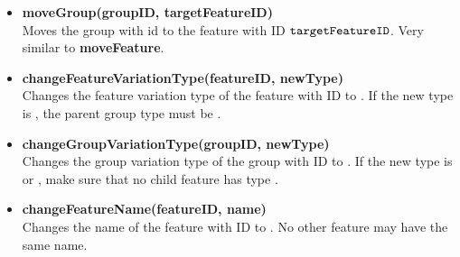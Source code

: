 \begin{itemize}
  \item \textbf{moveGroup(groupID, targetFeatureID)} \\
    Moves the group with id  to the feature with ID $\texttt{targetFeatureID}$. Very similar to \textbf{moveFeature}. 
  \item \textbf{changeFeatureVariationType(featureID, newType)} \\
    Changes the feature variation type of the feature with ID  to . If the new type is \mandatory{}, the parent group type must be \andtype{}. 
  \item \textbf{changeGroupVariationType(groupID, newType)}\\
    Changes the group variation type of the group with ID  to . If the new type is \ortype{} or \xortype{}, make sure that no child feature has type \mandatory{}. 
  \item \textbf{changeFeatureName(featureID, name)}\\
    Changes the name of the feature with ID  to . No other feature may have the same name.
\end{itemize}


